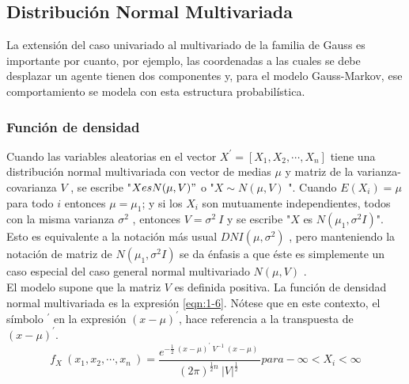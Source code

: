 \subsection{Distribución Normal Multivariada}
La extensión del caso univariado al multivariado de la familia de Gauss es importante por cuanto, por ejemplo, las coordenadas a las cuales se debe desplazar un agente tienen dos componentes y, para el modelo Gauss-Markov, ese comportamiento se modela con esta estructura probabilística. 
\subsubsection{Función de densidad}
Cuando las variables aleatorias en el vector  $X^\prime=[X_1,X_2,\cdots,X_n ]$  tiene una distribución normal multivariada con vector de medias  $\mu$ y matriz de la varianza-covarianza $V$ , se escribe "$X es N(\mu,V)"$    o  "$X\sim N(\mu,V)$ ". Cuando $E(X_i )=\mu$   para todo $i$ entonces $\mu=\mu_1$; y si los $X_i$   son mutuamente independientes, todos con la misma varianza $\sigma^2$ , entonces $V=\sigma^2\ I$   y se escribe  "$X$  es $N(\mu_1,\sigma^2 I)$". Esto es equivalente a la notación más usual  $ DNI(\mu,\sigma^2 )$ , pero manteniendo la notación de matriz de $N(\mu_1,\sigma^2 I)$ se da énfasis a que éste es simplemente un caso especial del caso general normal multivariado $N(\mu,V)$ .\\

El modelo supone que la matriz   $V$ es definida positiva. La función de densidad normal multivariada es la expresión \ref{eqn:1-6}. Nótese que en este contexto, el símbolo $^\prime$  en la expresión $(x-\mu)^\prime$, hace referencia a la transpuesta de $(x-\mu)^\prime$.
\begin{equation}
    f_X\ (x_1,x_2,\cdots,x_n\ )=\frac{e^{-\frac{1}{2}\ (x-\mu)^\prime\ V^{-1}\ (x-\mu)\ }}{(2\pi)^{\frac{1}{2} n}\ |V|^{\frac{1}{2}}\ }
    para  -\infty<X_i<\infty
\label{eqn:1-6}
\end{equation}
